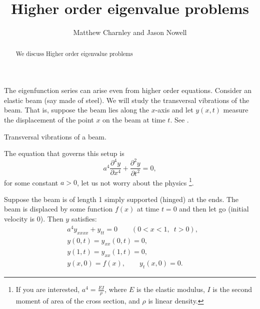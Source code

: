 \documentclass{ximera}
\title{Higher order eigenvalue problems}
\author{Matthew Charnley and Jason Nowell}
\begin{document}
\begin{abstract}
    We discuss Higher order eigenvalue problems
\end{abstract}
\maketitle


The eigenfunction series can arise even from higher order equations. Consider an elastic beam (say made of steel).  We will study the transversal vibrations of the beam.  That is, suppose the beam lies along the $x$-axis and let $y(x,t)$ measure the displacement of the point $x$ on the beam at time $t$.  See .

\label{sec:appeig}

%


\begin{myfig}
    \capstart
    
    \caption{Transversal vibrations of a beam.\label{appeig:transbeamfig}}
\end{myfig}

The equation that governs this setup is
\begin{equation*}
    a^4 \frac{\partial^4 y}{\partial x^4} + \frac{\partial^2 y}{\partial t^2} = 0,
\end{equation*}
for some constant $a > 0$, let us not worry about the physics%
\footnote{%
    If you are interested, $a^4 = \frac{EI}{\rho}$, where $E$ is the elastic modulus, $I$ is the second moment of area of the cross section, and $\rho$ is linear density.%
    }.%

Suppose the beam is of length 1 simply supported (hinged) at the ends. The beam is displaced by some function $f(x)$ at time $t=0$ and then let go (initial velocity is 0).  Then $y$ satisfies:
\begin{equation} 
    \label{appeig:beameq}
    \begin{aligned}
        & a^4 y_{xxxx} + y_{tt} = 0 \qquad (0 < x < 1, \enspace t > 0), \\
        & y(0,t) = y_{xx}(0,t) = 0 , \\
        & y(1,t) = y_{xx}(1,t) = 0 , \\
        & y(x,0) = f(x), \qquad y_{t}(x,0) = 0 .
    \end{aligned}
\end{equation}
\end{document}
